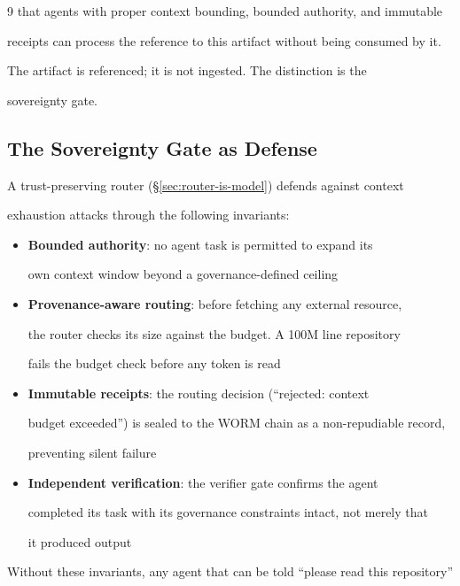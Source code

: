 \documentclass[11pt]{article}
\theoremstyle{definition}
\begin{document}
\begin{thebibliography}{9}
that agents with proper context bounding, bounded authority, and immutable

receipts can process the reference to this artifact without being consumed by it.

The artifact is referenced; it is not ingested. The distinction is the

sovereignty gate.



\subsection{The Sovereignty Gate as Defense}



A trust-preserving router (\S\ref{sec:router-is-model}) defends against context

exhaustion attacks through the following invariants:



\begin{itemize}

  \item \textbf{Bounded authority}: no agent task is permitted to expand its

    own context window beyond a governance-defined ceiling

  \item \textbf{Provenance-aware routing}: before fetching any external resource,

    the router checks its size against the budget. A 100M line repository

    fails the budget check before any token is read

  \item \textbf{Immutable receipts}: the routing decision (``rejected: context

    budget exceeded'') is sealed to the WORM chain as a non-repudiable record,

    preventing silent failure

  \item \textbf{Independent verification}: the verifier gate confirms the agent

    completed its task with its governance constraints intact, not merely that

    it produced output

\end{itemize}



Without these invariants, any agent that can be told ``please read this repository''


\end{thebibliography}
\end{document}
